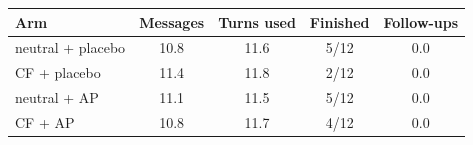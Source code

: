\begin{tabular}{lcccc}
\toprule
Arm & Messages & Turns used & Finished & Follow-ups \\
\midrule
neutral + placebo & 10.8 & 11.6 & 5/12 & 0.0 \\
CF + placebo & 11.4 & 11.8 & 2/12 & 0.0 \\
neutral + AP & 11.1 & 11.5 & 5/12 & 0.0 \\
CF + AP & 10.8 & 11.7 & 4/12 & 0.0 \\
\bottomrule
\end{tabular}
